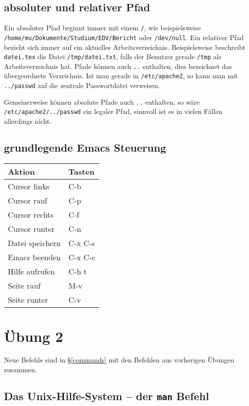 \documentclass[12pt]{article}
\begin{document}
\subsection{absoluter und relativer Pfad}

Ein absoluter Pfad beginnt immer mit einem \texttt{/}, wie beispielsweise \\ \texttt{/home/mu/Dokumente/Studium/EDV/Bericht} oder \texttt{/dev/null}. Ein relativer Pfad bezieht sich immer auf ein aktuelles Arbeitsverzeichnis. Beispielsweise beschreibt \texttt{datei.tex} die Datei \texttt{/tmp/datei.txt}, falls der Benutzer gerade \texttt{/tmp} als Arbeitsverzeichnis hat. Pfade können auch \texttt{..} enthalten, dies bezeichnet das übergeordnete Verzeichnis. Ist man gerade in \texttt{/etc/apache2}, so kann man mit \texttt{../passwd} auf die zentrale Passwortdatei verweisen.

Gemeinerweise können absolute Pfade auch \texttt{..} enthalten, so wäre \\
\texttt{/etc/apache2/../passwd} ein legaler Pfad, sinnvoll ist es in vielen Fällen allerdings nicht.

\subsection{grundlegende Emacs Steuerung}

\begin{tabular}{ll}
Aktion & Tasten \\
\hline
Cursor links & C-b \\
Cursor rauf & C-p \\
Cursor rechts & C-f \\
Cursor runter & C-n \\
Datei speichern & C-x C-s \\
Emacs beenden & C-x C-c \\
Hilfe aufrufen & C-h t \\
Seite rauf & M-v \\
Seite runter & C-v \\
\end{tabular}

\section{Übung 2}

Neue Befehle sind in §\ref{commands} mit den Befehlen aus vorherigen Übungen zusammen.

\subsection{Das Unix-Hilfe-System -- der \texttt{man} Befehl}
\end{document}
